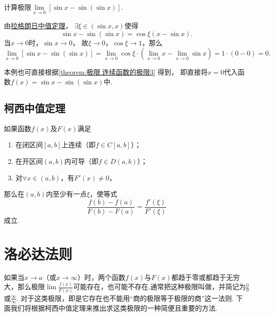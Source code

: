 \begin{example}
\def\l{\lim\limits_{x\to0}}%
计算极限\(\l \left[\sin x - \sin(\sin x)\right]\).
\begin{solution}
由\hyperref[theorem:微分中值定理.拉格朗日中值定理]{拉格朗日中值定理}，
\(\exists\xi\in(\sin x,x)\)使得\[
	\sin x - \sin(\sin x)
	= \cos\xi (x-\sin x).
\]
当\(x\to0\)时，\(\sin x\to0\)，
故\(\xi\to0\)，\(\cos\xi\to1\)，那么\[
	\l \left[\sin x - \sin(\sin x)\right]
	= \l \cos\xi \cdot \left(\l x - \l \sin x\right)
	= 1 \cdot (0-0) = 0.
\]
\end{solution}
\end{example}
本例也可直接根据\cref{theorem:极限.连续函数的极限3} 得到，
即直接将\(x=0\)代入函数\(f(x) = \sin x - \sin(\sin x)\)中.

\subsection{柯西中值定理}
\begin{theorem}[柯西中值定理]\label{theorem:微分中值定理.柯西中值定理}
如果函数\(f(x)\)及\(F(x)\)满足
\begin{enumerate}
	\item 在闭区间\([a,b]\)上连续（即\(f \in C[a,b]\)）；
	\item 在开区间\((a,b)\)内可导（即\(f \in D(a,b)\)）；
	\item 对\(\forall x\in(a,b)\)，有\(F'(x) \neq 0\)，
\end{enumerate}
那么在\((a,b)\)内至少有一点\(\xi\)，使等式
\begin{equation}
\frac{f(b)-f(a)}{F(b)-F(a)}=\frac{f'(\xi)}{F'(\xi)}
\end{equation}
成立.
\end{theorem}

\section{洛必达法则}
如果当\(x \to a\)（或\(x \to \infty\)）时，两个函数\(f(x)\)与\(F(x)\)都趋于零或都趋于无穷大，那么极限\(\lim\frac{f(x)}{F(x)}\)可能存在，也可能不存在.通常把这种极限叫做，并简记为\(\frac{0}{0}\)或\(\frac{\infty}{\infty}\).
对于这类极限，即是它存在也不能用“商的极限等于极限的商”这一法则.
下面我们将根据柯西中值定理来推出求这类极限的一种简便且重要的方法.

